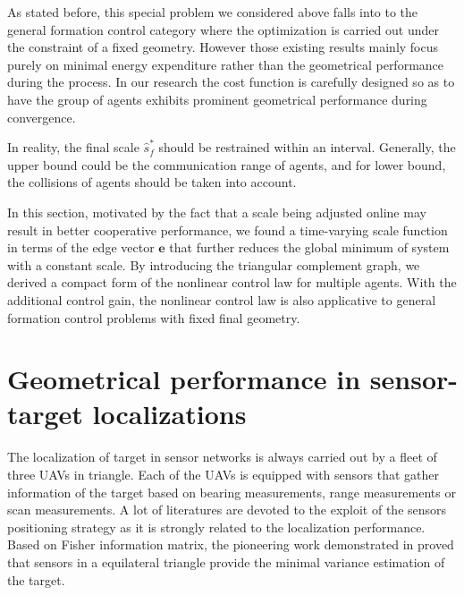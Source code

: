 \documentclass[times]{rncauth}
\begin{document}
As stated before, this special problem we considered above falls
into to the general
 formation control category where the optimization is carried out under the constraint of a fixed
 geometry. However those existing results mainly focus purely on
 minimal energy expenditure\cite{Belta04optimal}
  rather than the geometrical performance during the process. In our research the cost
  function is carefully designed so as to have the group of agents
  exhibits prominent geometrical performance during convergence.

  In reality, the final scale $\hat{s}^*_f$ should be restrained within an interval. Generally, the
  upper bound could be the communication
  range of agents, and for lower bound, the collisions of agents should be taken into
  account.

In this section, motivated by the fact that a scale being adjusted
online may result in better cooperative performance, we found a
time-varying scale function in terms of the edge vector $\mathbf{e}$
that further reduces the global minimum of system with a constant
scale. By introducing the triangular complement graph, we derived a
compact form of the nonlinear control law for multiple agents. With
the additional control gain, the nonlinear control law is also
applicative to general formation control problems with fixed final
geometry.

\section{Geometrical performance in sensor-target localizations}\label{sec:localization}
 The localization of target in sensor networks is always carried out by a fleet of
 three
UAVs in triangle. Each of the UAVs is equipped with sensors that
gather information of the target based on bearing
measurements\cite{Dovganccay05bearing}, range
measurements\cite{Martinez06rangelocalization} or scan
measurements\cite{Dogancay07scan}. A lot of literatures are devoted
to the exploit of the sensors positioning strategy as it is strongly
related to the localization performance. Based on Fisher information
matrix, the pioneering work demonstrated in \cite{Bishop10sensor}
proved that sensors in a equilateral triangle provide the minimal
variance estimation of the target.
\end{document}
